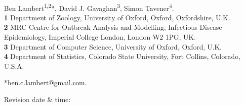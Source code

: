 \documentclass[10pt,letterpaper]{article}
\begin{document}
\vspace*{0.2in}

\begin{flushleft}
{\Large
\textbf{}
}
\newline
\\
Ben Lambert\textsuperscript{1,2}*,
David J. Gavaghan\textsuperscript{3},
Simon Tavener\textsuperscript{4}.
\\
\bigskip
\textbf{1} Department of Zoology, University of Oxford, Oxford, Oxfordshire, U.K.
\\
\textbf{2} MRC Centre for Outbreak Analysis and Modelling, Infectious Disease Epidemiology, Imperial College London, London W2 1PG, UK.
\\
\textbf{3} Department of Computer Science, University of Oxford, Oxford, U.K.
\\
\textbf{4} Department of Statistics, Colorado State University, Fort Collins, Colorado, U.S.A.
\\
\bigskip

*ben.c.lambert@gmail.com.

\end{flushleft}

\hfill Revision date \& time: \timestamp
\bigskip




\end{document}

